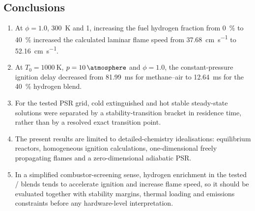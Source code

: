 \documentclass[11pt]{article}
\begin{document}
\subsection{Conclusions}
\begin{enumerate}
  \item At $\phi=1.0$, \SI{300}{\kelvin} and \SI{1}{\atmosphere}, increasing
  the fuel hydrogen fraction from \SI{0}{\percent} to \SI{40}{\percent}
  increased the calculated laminar flame speed from
  \SI{37.68}{\centi\meter\per\second} to
  \SI{52.16}{\centi\meter\per\second}.

  \item At $T_0=\SI{1000}{\kelvin}$, $p=\SI{10}{\atmosphere}$ and $\phi=1.0$,
  the constant-pressure ignition delay decreased from
  \SI{81.99}{\milli\second} for methane--air to
  \SI{12.64}{\milli\second} for the \SI{40}{\percent} hydrogen blend.

  \item For the tested PSR grid, cold extinguished and hot stable
  steady-state solutions were separated by a stability-transition bracket in
  residence time, rather than by a resolved exact transition point.

  \item The present results are limited to detailed-chemistry idealisations:
  equilibrium reactors, homogeneous ignition calculations, one-dimensional
  freely propagating flames and a zero-dimensional adiabatic PSR.

  \item In a simplified combustor-screening sense, hydrogen enrichment in the
  tested / blends tends to accelerate ignition and increase
  flame speed, so it should be evaluated together with stability margins,
  thermal loading and emissions constraints before any hardware-level
  interpretation.
\end{enumerate}

\clearpage

{}


\end{document}
